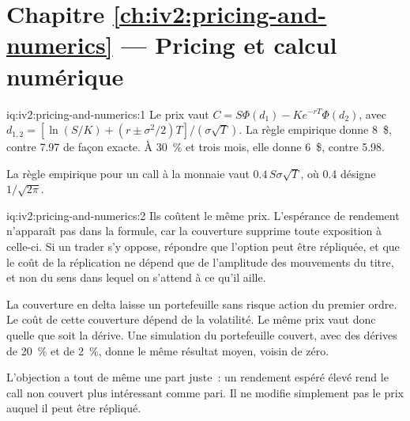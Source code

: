 \section*{Chapitre \ref{ch:iv2:pricing-and-numerics} --- Pricing et calcul numérique}

\begin{solution}{iq:iv2:pricing-and-numerics:1}
Le prix vaut $C = S\Phi(d_1) - Ke^{-rT}\Phi(d_2)$, avec $d_{1,2} = [\ln(S/K) + (r \pm \sigma^2/2)T]/(\sigma\sqrt T)$. La règle empirique donne 8~\$, contre 7.97 de façon exacte. À 30~\% et trois mois, elle donne 6~\$, contre 5.98.

La règle empirique pour un call à la monnaie vaut $0.4\,S\sigma\sqrt T$, où 0.4 désigne $1/\sqrt{2\pi}$.

\end{solution}

\begin{solution}{iq:iv2:pricing-and-numerics:2}
Ils coûtent le même prix. L'espérance de rendement n'apparaît pas dans la formule, car la couverture supprime toute exposition à celle-ci. Si un trader s'y oppose, répondre que l'option peut être répliquée, et que le coût de la réplication ne dépend que de l'amplitude des mouvements du titre, et non du sens dans lequel on s'attend à ce qu'il aille.

La couverture en delta laisse un portefeuille sans risque action du premier ordre. Le coût de cette couverture dépend de la volatilité. Le même prix vaut donc quelle que soit la dérive. Une simulation du portefeuille couvert, avec des dérives de 20~\% et de 2~\%, donne le même résultat moyen, voisin de zéro.

L'objection a tout de même une part juste~: un rendement espéré élevé rend le call non couvert plus intéressant comme pari. Il ne modifie simplement pas le prix auquel il peut être répliqué.

\end{solution}

